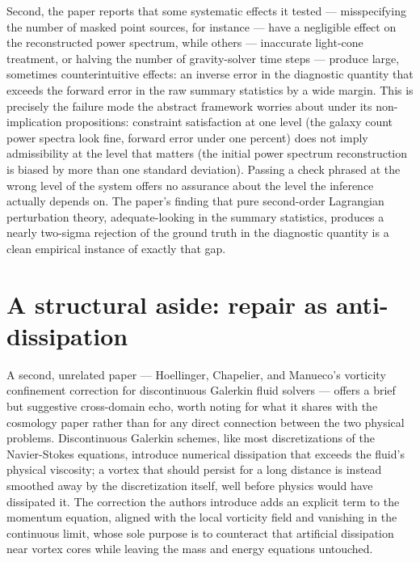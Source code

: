 \documentclass[11pt]{article}
\begin{document}
Second, the paper reports that some systematic effects it tested --- misspecifying the number of masked point sources, for instance --- have a negligible effect on the reconstructed power spectrum, while others --- inaccurate light-cone treatment, or halving the number of gravity-solver time steps --- produce large, sometimes counterintuitive effects: an inverse error in the diagnostic quantity that exceeds the forward error in the raw summary statistics by a wide margin. This is precisely the failure mode the abstract framework worries about under its non-implication propositions: constraint satisfaction at one level (the galaxy count power spectra look fine, forward error under one percent) does not imply admissibility at the level that matters (the initial power spectrum reconstruction is biased by more than one standard deviation). Passing a check phrased at the wrong level of the system offers no assurance about the level the inference actually depends on. The paper's finding that pure second-order Lagrangian perturbation theory, adequate-looking in the summary statistics, produces a nearly two-sigma rejection of the ground truth in the diagnostic quantity is a clean empirical instance of exactly that gap.

\section{A structural aside: repair as anti-dissipation}

A second, unrelated paper --- Hoellinger, Chapelier, and Manueco's vorticity confinement correction for discontinuous Galerkin fluid solvers \cite{hoellinger2025vorticity} --- offers a brief but suggestive cross-domain echo, worth noting for what it shares with the cosmology paper rather than for any direct connection between the two physical problems. Discontinuous Galerkin schemes, like most discretizations of the Navier-Stokes equations, introduce numerical dissipation that exceeds the fluid's physical viscosity; a vortex that should persist for a long distance is instead smoothed away by the discretization itself, well before physics would have dissipated it. The correction the authors introduce adds an explicit term to the momentum equation, aligned with the local vorticity field and vanishing in the continuous limit, whose sole purpose is to counteract that artificial dissipation near vortex cores while leaving the mass and energy equations untouched.
\end{document}
